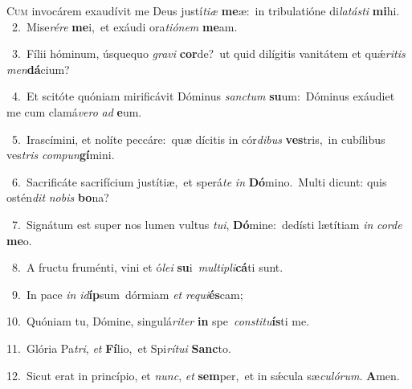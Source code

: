 \lettrine{\initial\textcolor{\initialcolor}{C}}{um} invocárem exaudívit me Deus justí\-\textit{ti}\-\textit{æ} \textbf{me}\-æ:~\star in tribulatióne di\-\textit{la}\-\textit{tás}\textit{ti} \textbf{mi}\-hi.\\
{\numbfont\textcolor{\numbcolor}{~2.}}~Mise\-\textit{ré}\-\textit{re} \textbf{me}\-i,~\star et exáudi ora\-\textit{ti}\-\textit{ó}\textit{nem} \textbf{me}\-am.\par
{\numbfont\textcolor{\numbcolor}{~3.}}~Fílii hóminum, úsquequo \textit{gra}\-\textit{vi} \textbf{cor}\-de?~\star ut quid dilígitis vanitátem et quǽ\-\textit{ri}\-\textit{tis} \textit{men}\-\textbf{dá}cium?\par
{\numbfont\textcolor{\numbcolor}{~4.}}~Et scitóte quóniam mirificávit Dóminus \textit{sanc}\-\textit{tum} \textbf{su}\-um:~\star Dóminus exáudiet me cum clamá\-\textit{ve}\-\textit{ro} \textit{ad} \textbf{e}\-um.\par
{\numbfont\textcolor{\numbcolor}{~5.}}~Irascímini, et nolíte peccáre:~\dagger quæ dícitis in cór\-\textit{di}\-\textit{bus} \textbf{ves}\-tris,~\star in cubílibus ves\textit{tris} \textit{com}\-\textit{pun}\textbf{gí}mini.\par
{\numbfont\textcolor{\numbcolor}{~6.}}~Sacrificáte sacrifícium justítiæ,~\dagger et sperá\textit{te} \textit{in} \textbf{Dó}\-mino.~\star Multi dicunt: quis ostén\textit{dit} \textit{no}\-\textit{bis} \textbf{bo}\-na?\par
{\numbfont\textcolor{\numbcolor}{~7.}}~Signátum est super nos lumen vultus \textit{tu}\-\textit{i}, \textbf{Dó}\-mine:~\star dedísti lætítiam \textit{in} \textit{cor}\-\textit{de} \textbf{me}\-o.\par
{\numbfont\textcolor{\numbcolor}{~8.}}~A fructu fruménti, vini et ó\-\textit{le}\-\textit{i} \textbf{su}\-i~\star \textit{mul}\-\textit{ti}\textit{pli}\textbf{cá}ti sunt.\par
{\numbfont\textcolor{\numbcolor}{~9.}}~In pace \textit{in} \textit{id}\-\textbf{íp}sum~\star dórmiam \textit{et} \textit{re}\-\textit{qui}\textbf{és}cam;\par
{\numbfont\textcolor{\numbcolor}{10.}}~Quóniam tu, Dómine, singulá\-\textit{ri}\-\textit{ter} \textbf{in} spe~\star \textit{con}\-\textit{sti}\textit{tu}\textbf{ís}ti me.\par
{\numbfont\textcolor{\numbcolor}{11.}}~Glória Pa\-\textit{tri}\-, \textit{et} \textbf{Fí}\-lio,~\star et Spi\-\textit{rí}\-\textit{tu}\textit{i} \textbf{Sanc}\-to.\par
{\numbfont\textcolor{\numbcolor}{12.}}~Sicut erat in princípio, et \textit{nunc}\-, \textit{et} \textbf{sem}\-per,~\star et in sǽcula sæ\-\textit{cu}\-\textit{ló}\textit{rum}. \textbf{A}\-men.\par
